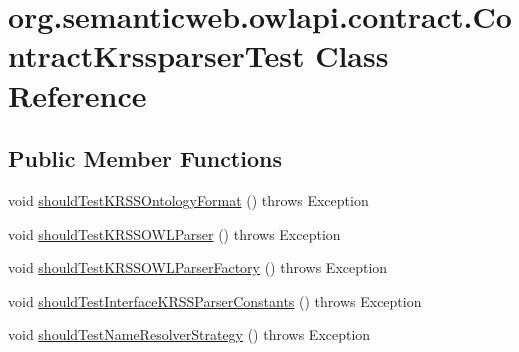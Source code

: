 \hypertarget{classorg_1_1semanticweb_1_1owlapi_1_1contract_1_1_contract_krssparser_test}{\section{org.\-semanticweb.\-owlapi.\-contract.\-Contract\-Krssparser\-Test Class Reference}
\label{classorg_1_1semanticweb_1_1owlapi_1_1contract_1_1_contract_krssparser_test}
}
\subsection*{Public Member Functions}
\begin{DoxyCompactItemize}
\item 
void \hyperlink{classorg_1_1semanticweb_1_1owlapi_1_1contract_1_1_contract_krssparser_test_aed33bb4cfcdffb36a83b3eb407a02bae}{should\-Test\-K\-R\-S\-S\-Ontology\-Format} ()  throws Exception 
\item 
void \hyperlink{classorg_1_1semanticweb_1_1owlapi_1_1contract_1_1_contract_krssparser_test_a37cb33454ba6daf7a8b1a3f945c9eb6b}{should\-Test\-K\-R\-S\-S\-O\-W\-L\-Parser} ()  throws Exception 
\item 
void \hyperlink{classorg_1_1semanticweb_1_1owlapi_1_1contract_1_1_contract_krssparser_test_aa890230874b5b4b01620b7a900cae8ed}{should\-Test\-K\-R\-S\-S\-O\-W\-L\-Parser\-Factory} ()  throws Exception 
\item 
void \hyperlink{classorg_1_1semanticweb_1_1owlapi_1_1contract_1_1_contract_krssparser_test_a0c2d615da56acedffa5bb39e8e2b39a1}{should\-Test\-Interface\-K\-R\-S\-S\-Parser\-Constants} ()  throws Exception 
\item 
void \hyperlink{classorg_1_1semanticweb_1_1owlapi_1_1contract_1_1_contract_krssparser_test_ae2d4791675802b831d56f3168ccab23f}{should\-Test\-Name\-Resolver\-Strategy} ()  throws Exception 
\end{DoxyCompactItemize}


